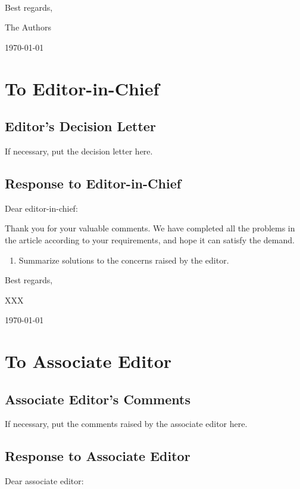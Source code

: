 \documentclass[12pt, review, authoryear]{elsarticle}
\def\mycoauthor{The Authors}
\def\mydate{\today} %
\begin{document}
~\\
\noindent Best regards,

\noindent \mycoauthor

\noindent \mydate



\newpage

\section{To Editor-in-Chief}


\subsection{Editor’s Decision Letter}

If necessary, put the decision letter here.


\subsection{Response to Editor-in-Chief}
\noindent Dear editor-in-chief: 

Thank you for your valuable comments. We have completed all the
problems in the article according to your requirements, and hope it can satisfy the demand.

\begin{enumerate}
  \item Summarize solutions to the concerns raised by the editor.
\end{enumerate}

\noindent Best regards,

\noindent XXX

\noindent \mydate

\section{To Associate Editor}
\subsection{Associate Editor’s Comments}

If necessary, put the comments raised by the associate editor here.


\subsection{Response to Associate Editor}
\noindent Dear associate editor:
\end{document}
